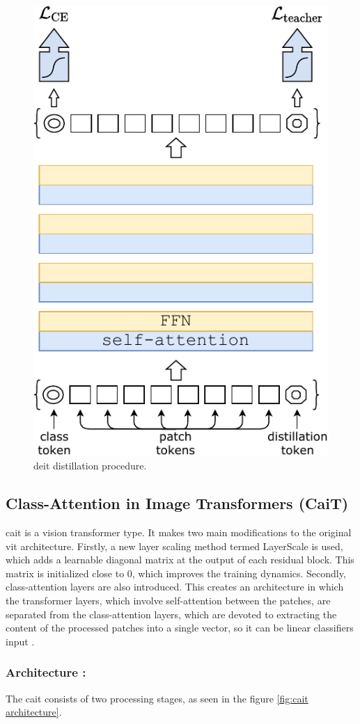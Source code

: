 \begin{figure}[ht!]
    \centering
    \includegraphics[width=0.5\linewidth]{Rohit_Master_Thesis//Images/deit_distillation_token.pdf}
    \caption{\gls{deit} distillation procedure\cite{pmlr-v139-touvron21a}.}
    \label{fig:deit distillation token}
\end{figure}

\subsection{Class-Attention in Image Transformers (CaiT)}

\gls{cait} is a vision transformer type. It makes two main modifications to the original \gls{vit} architecture. Firstly, a new layer scaling method termed LayerScale is used, which adds a learnable diagonal matrix at the output of each residual block. This matrix is initialized close to 0, which improves the training dynamics. Secondly, class-attention layers are also introduced. This creates an architecture in which the transformer layers, which involve self-attention between the patches, are separated from the class-attention layers, which are devoted to extracting the content of the processed patches into a single vector, so it can be linear classifiers input \cite{touvron2021going}. 

\subsubsection*{Architecture :}

The \gls{cait} consists of two processing stages, as seen in the figure \ref{fig:cait architecture}.

